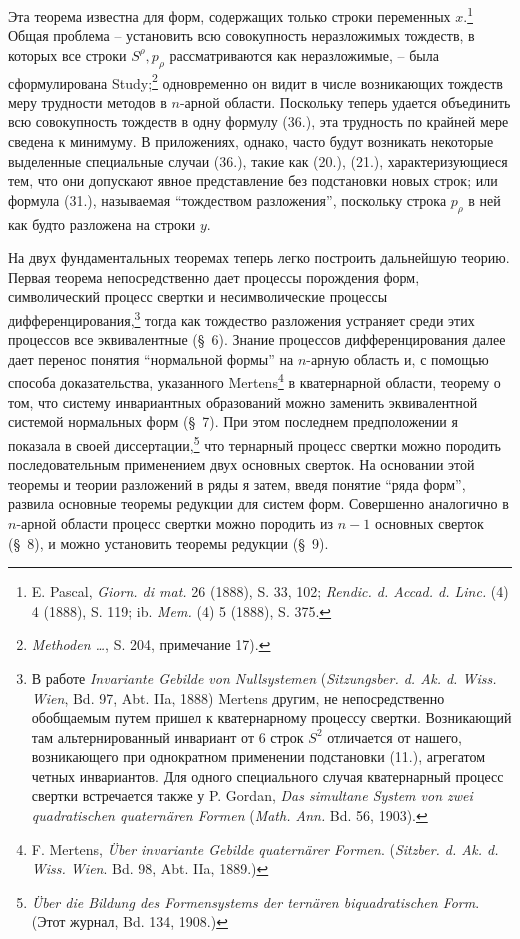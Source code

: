\documentclass[11pt]{article}
\begin{document}
Эта теорема известна для форм, содержащих только строки переменных $x$.\footnote{E. Pascal, \emph{Giorn. di mat.} 26 (1888), S. 33, 102; \emph{Rendic. d. Accad. d. Linc.} (4) 4 (1888), S. 119; ib. \emph{Mem.} (4) 5 (1888), S. 375.} Общая проблема -- установить всю совокупность неразложимых тождеств, в которых все строки $S^\rho,p_\rho$ рассматриваются как неразложимые, -- была сформулирована Study;\footnote{\emph{Methoden \dots}, S. 204, примечание 17).} одновременно он видит в числе возникающих тождеств меру трудности методов в $n$-арной области. Поскольку теперь удается объединить всю совокупность тождеств в одну формулу (36.), эта трудность по крайней мере сведена к минимуму. В приложениях, однако, часто будут возникать некоторые выделенные специальные случаи (36.), такие как (20.), (21.), характеризующиеся тем, что они допускают явное представление без подстановки новых строк; или формула (31.), называемая ``тождеством разложения'', поскольку строка $p_\rho$ в ней как будто разложена на строки $y$.

На двух фундаментальных теоремах теперь легко построить дальнейшую теорию. Первая теорема непосредственно дает процессы порождения форм, символический процесс свертки и несимволические процессы дифференцирования,\footnote{В работе \emph{Invariante Gebilde von Nullsystemen} (\emph{Sitzungsber. d. Ak. d. Wiss. Wien}, Bd. 97, Abt. IIa, 1888) Mertens другим, не непосредственно обобщаемым путем пришел к кватернарному процессу свертки. Возникающий там альтернированный инвариант от 6 строк $S^2$ отличается от нашего, возникающего при однократном применении подстановки (11.), агрегатом четных инвариантов. Для одного специального случая кватернарный процесс свертки встречается также у P. Gordan, \emph{Das simultane System von zwei quadratischen quaternären Formen} (\emph{Math. Ann.} Bd. 56, 1903).} тогда как тождество разложения устраняет среди этих процессов все эквивалентные (\S\ 6). Знание процессов дифференцирования далее дает перенос понятия ``нормальной формы'' на $n$-арную область и, с помощью способа доказательства, указанного Mertens\footnote{F. Mertens, \emph{Über invariante Gebilde quaternärer Formen}. (\emph{Sitzber. d. Ak. d. Wiss. Wien}. Bd. 98, Abt. IIa, 1889.)} в кватернарной области, теорему о том, что систему инвариантных образований можно заменить эквивалентной системой нормальных форм (\S\ 7). При этом последнем предположении я показала в своей диссертации,\footnote{\emph{Über die Bildung des Formensystems der ternären biquadratischen Form}. (Этот журнал, Bd. 134, 1908.)} что тернарный процесс свертки можно породить последовательным применением двух основных сверток. На основании этой теоремы и теории разложений в ряды я затем, введя понятие ``ряда форм'', развила основные теоремы редукции для систем форм. Совершенно аналогично в $n$-арной области процесс свертки можно породить из $n-1$ основных сверток (\S\ 8), и можно установить теоремы редукции (\S\ 9).
\end{document}
